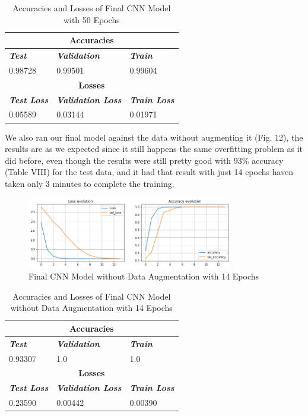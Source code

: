 \documentclass[conference]{IEEEtran}
\begin{document}
\begin{table}[htbp]
\caption{Accuracies and Losses of Final CNN Model with 50 Epochs}
\begin{center}
\begin{tabular}{|p{2cm}|p{2cm}|p{2cm}|}
\hline
\multicolumn{3}{|c|}{\textbf{Accuracies}} \\
\hline
\textbf{\textit{Test}}& \textbf{\textit{Validation}}& \textbf{\textit{Train}} \\
\hline
0.98728 & 0.99501 & 0.99604 \\
\hline
\multicolumn{3}{|c|}{\textbf{Losses}} \\
\hline
\textbf{\textit{Test Loss}}& \textbf{\textit{Validation Loss}}& \textbf{\textit{Train Loss}} \\
\hline
0.05589 & 0.03144 & 0.01971 \\
\hline
\end{tabular}
\end{center}
\end{table}

We also ran our final model against the data without augmenting it (Fig. 12), the results are as we expected since it still happens the same overfitting problem as it did before, even though the results were still pretty good with 93\% accuracy (Table VIII) for the test data, and it had that result with just 14 epochs haven taken only 3 minutes to complete the training.

\begin{figure}[htbp]
    \centerline{\includegraphics[width=9cm]{img/final_model_noDataAug.png}}
    \caption{Final CNN Model without Data Augmentation with 14 Epochs}
    \label{fig:hist_train_classes}
\end{figure}

\begin{table}[htbp]
\caption{Accuracies and Losses of Final CNN Model without Data Augmentation with 14 Epochs}
\begin{center}
\begin{tabular}{|p{2cm}|p{2cm}|p{2cm}|}
\hline
\multicolumn{3}{|c|}{\textbf{Accuracies}} \\
\hline
\textbf{\textit{Test}}& \textbf{\textit{Validation}}& \textbf{\textit{Train}} \\
\hline
0.93307 & 1.0 & 1.0 \\
\hline
\multicolumn{3}{|c|}{\textbf{Losses}} \\
\hline
\textbf{\textit{Test Loss}}& \textbf{\textit{Validation Loss}}& \textbf{\textit{Train Loss}} \\
\hline
0.23590 & 0.00442 & 0.00390 \\
\hline
\end{tabular}
\end{center}
\end{table}
\end{document}
